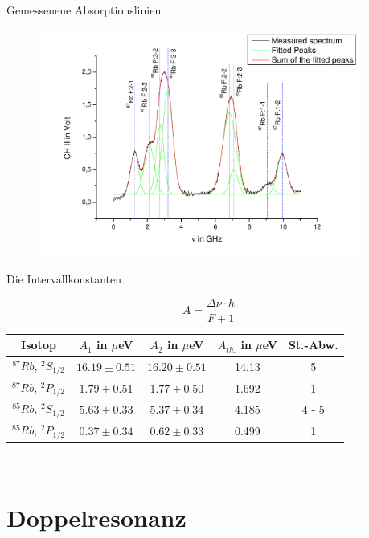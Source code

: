 \documentclass{beamer}
\begin{document}
\begin{frame}{Gemessenene Absorptionslinien}
	\begin{figure}[H]
	\centering \includegraphics[width=0.95\textwidth]{Bilder/HFSAusw.pdf}
	\end{figure}
\end{frame}

\begin{frame}{Die Intervallkonstanten}

$$A = \frac{\Delta\nu\cdot h}{F+1}$$

\begin{center}
\begin{tabular}[H]{| c | c c c c |} \hline
Isotop & $A_1$ in $\mu$eV & $A_2$ in $\mu$eV & $A_{th.}$ in $\mu$eV & St.-Abw.\\ \hline
$^{87}Rb$, $^2S_{1/2}$ & $16.19 \pm 0.51$ & $16.20 \pm 0.51$ & 14.13  & 5 \\
$^{87}Rb$, $^2P_{1/2}$ & $1.79 \pm 0.51$ &  $1.77 \pm 0.50$ & 1.692   & 1 \\
$^{85}Rb$, $^2S_{1/2}$ & $5.63 \pm 0.33$ &  $5.37 \pm 0.34$ & 4.185   & 4 - 5 \\
$^{85}Rb$, $^2P_{1/2}$ & $0.37 \pm 0.34$ &  $0.62 \pm 0.33$ & 0.499   & 1 \\ \hline
\end{tabular}\\
\end{center}

\end{frame}


\section{Doppelresonanz}
\begin{frame}
\begin{center}
\end{center}
\end{frame}
\end{document}
